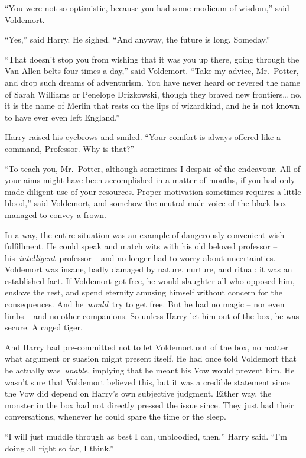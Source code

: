 ``You were not so optimistic, because you had some modicum of wisdom,''
said Voldemort.

``Yes,'' said Harry. He sighed. ``And anyway, the future is long.
Someday.''

``That doesn't stop you from wishing that it was you up there, going
through the Van Allen belts four times a day,'' said Voldemort. ``Take
my advice, Mr.~Potter, and drop such dreams of adventurism. You have
never heard or revered the name of Sarah Williams or Penelope
Drizkowski, though they braved new frontiers\ldots{} no, it is the name
of Merlin that rests on the lips of wizardkind, and he is not known to
have ever even left England.''

Harry raised his eyebrows and smiled. ``Your comfort is always offered
like a command, Professor. Why is that?''

``To teach you, Mr.~Potter, although sometimes I despair of the
endeavour. All of your aims might have been accomplished in a matter of
months, if you had only made diligent use of your resources. Proper
motivation sometimes requires a little blood,'' said Voldemort, and
somehow the neutral male voice of the black box managed to convey a
frown.

In a way, the entire situation was an example of dangerously convenient
wish fulfillment. He could speak and match wits with his old beloved
professor -- his~\emph{intelligent}~professor -- and no longer had to
worry about uncertainties. Voldemort was insane, badly damaged by
nature, nurture, and ritual: it was an established fact. If Voldemort
got free, he would slaughter all who opposed him, enslave the rest, and
spend eternity amusing himself without concern for the consequences. And
he~\emph{would}~try to get free. But he had no magic -- nor even limbs
-- and no other companions. So unless Harry let him out of the box, he
was secure. A caged tiger.

And Harry had pre-committed not to let Voldemort out of the box, no
matter what argument or suasion might present itself. He had once told
Voldemort that he actually was~\emph{unable}, implying that he meant his
Vow would prevent him. He wasn't sure that Voldemort believed this, but
it was a credible statement since the Vow did depend on Harry's own
subjective judgment. Either way, the monster in the box had not directly
pressed the issue since. They just had their conversations, whenever he
could spare the time or the sleep.

``I will just muddle through as best I can, unbloodied, then,'' Harry
said. ``I'm doing all right so far, I think.''

